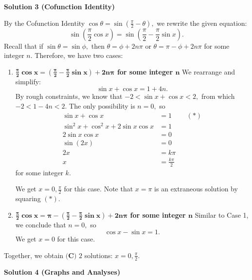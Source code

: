 \begin{enumerate}
 



\textbf{Solution 3 (Cofunction Identity)}

By the Cofunction Identity $\cos\theta=\sin\left(\frac{\pi}{2}-\theta\right),$ we rewrite the given equation: 
 \[\sin \left(\frac{\pi}2 \cos x\right) = \sin \left(\frac{\pi}2 - \frac{\pi}2 \sin x\right).\]Recall that if $\sin\theta=\sin\phi,$ then $\theta=\phi+2n\pi$ or $\theta=\pi-\phi+2n\pi$ for some integer $n.$ Therefore, we have two cases:

 
            \begin{enumerate} 
        \item \textbf{$\boldsymbol{\frac{\pi}2 \cos x = \left(\frac{\pi}2 - \frac{\pi}2 \sin x\right) + 2n\pi}$ for some integer $\boldsymbol{n}$} We rearrange and simplify: 
 \[\sin x + \cos x = 1 + 4n.\]By rough constraints, we know that $-2 < \sin x + \cos x < 2,$ from which $-2 < 1 - 4n < 2.$ The only possibility is $n=0,$ so
 \begin{align*} \sin x + \cos x &= 1 && (*) \\ \sin^2 x + \cos^2 x + 2\sin x \cos x &= 1 \\ 2\sin x \cos x &= 0 \\ \sin(2x) &= 0 \\ 2x &= k\pi \\ x &= \frac{k\pi}{2} \end{align*}
for some integer $k.$ 

 We get $x=0,\frac{\pi}{2}$ for this case. Note that $x=\pi$ is an extraneous solution by squaring $(*).$


        \item \textbf{$\boldsymbol{\frac{\pi}2 \cos x = \pi - \left(\frac{\pi}2 - \frac{\pi}2 \sin x\right) + 2n\pi}$ for some integer $\boldsymbol{n}$} Similar to Case 1, we conclude that $n=0,$ so 
 \[\cos x - \sin x = 1.\]We get $x=0$ for this case.

 

            \end{enumerate}
            Together, we obtain $\boxed{\textbf{(C) }2}$ solutions: $x=0,\frac{\pi}{2}.$




\textbf{Solution 4 (Graphs and Analyses)}


\end{enumerate}
